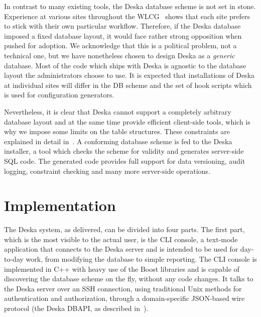 \documentclass[deska]{subfiles}
\begin{document}
In contrast to many existing tools, the Deska database scheme is not set in stone.  Experience at various sites
throughout the WLCG~\cite{wlcg} shows that each site prefers to stick with their own particular workflow.  Therefore, if
the Deska database imposed a fixed database layout, it would face rather strong opposition when pushed for adoption.  We
acknowledge that this is a political problem, not a technical one, but we have nonetheless chosen to design Deska as a
{\em generic} database.  Most of the code which ships with Deska is agnostic to the database layout the administrators
choose to use.  It is expected that installations of Deska at individual sites will differ in the DB scheme and the set
of hook scripts which is used for configuration generators.

Nevertheless, it is clear that Deska cannot support a completely arbitrary database layout and at the same time provide
efficient client-side tools, which is why we impose some limits on the table structures.  These constraints are
explained in detail in~.  A conforming database scheme is fed to the Deska installer,
a tool which checks the scheme for validity and generates server-side SQL code.  The generated code provides full
support for data versioning, audit logging, constraint checking and many more server-side operations.

\section{Implementation}

The Deska system, as delivered, can be divided into four parts.  The first part, which is the most visible to the actual
user, is the CLI console, a text-mode application that connects to the Deska server and is intended to be used for
day-to-day work, from modifying the database to simple reporting.  The CLI console is implemented in C++ with heavy use
of the Boost libraries and is capable of discovering the database scheme on the fly, without any code changes.  It talks
to the Deska server over an SSH connection, using traditional Unix methods for authentication and authorization, through
a domain-specific JSON-based wire protocol (the Deska DBAPI, as described in~).
\end{document}
